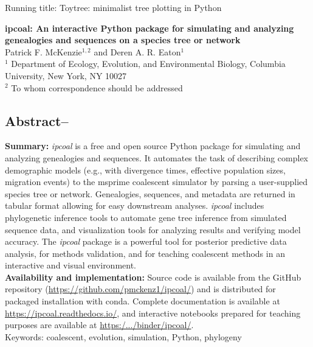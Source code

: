 \documentclass[11pt]{article}
\begin{document}
\noindent Running title: Toytree: minimalist tree plotting in Python\\

\begin{center}
{\bf \Large 
ipcoal: An interactive Python package for simulating and analyzing genealogies and sequences on a species tree or network
}\\[0.25cm]

Patrick F. McKenzie$^{1, 2}$ and Deren A. R. Eaton$^{1}$\\[0.25cm]

$^{1}$ Department of Ecology, Evolution, and Environmental Biology, Columbia University, New York, NY 10027 \\
$^{2}$ To whom correspondence should be addressed

\end{center}
\noindent

\subsection*{Abstract--}
\textbf{Summary:} \emph{ipcoal} is a free and open source Python package for simulating and analyzing genealogies and sequences. It automates the task of describing complex demographic models (e.g., with divergence times, effective population sizes, migration events) to the msprime coalescent simulator by parsing a user-supplied species tree or network. Genealogies, sequences, and metadata are returned in tabular format allowing for easy downstream analyses. \emph{ipcoal} includes phylogenetic inference tools to automate gene tree inference from simulated sequence data, and visualization tools for analyzing results and verifying model accuracy. The \emph{ipcoal} package is a powerful tool for posterior predictive data analysis, for methods validation, and for teaching coalescent methods in an interactive and visual environment. \\

\noindent \textbf{Availability and implementation:} Source code is available from the GitHub repository (\url{https://github.com/pmckenz1/ipcoal/}) and is distributed for packaged installation with conda. Complete documentation is available at \url{https://ipcoal.readthedocs.io/}, and interactive notebooks prepared for teaching purposes are available at \url{https:/.../binder/ipcoal/}.\\

\noindent Keywords: coalescent, evolution, simulation, Python, phylogeny
\end{document}
